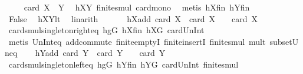 \begin{isabellebody}
\ \isamarkupfalse%
\ {\isachardoublequoteopen}{\isachardot}{\kern0pt}{\isachardot}{\kern0pt}{\isachardot}{\kern0pt}\ {\isasymle}\ card\ {\isacharparenleft}{\kern0pt}X\ {\isasymcdots}\ Y{\isacharparenright}{\kern0pt}{\isachardoublequoteclose}\ \isamarkupfalse%
\ hXY{}\ finite{\isacharunderscore}{\kern0pt}smul\ card{\isacharunderscore}{\kern0pt}mono\ \isamarkupfalse%
\ {\isacharparenleft}{\kern0pt}metis\ hXfin\ hYfin{\isacharparenright}{\kern0pt}\isanewline
\ \ \ \ \isamarkupfalse%
\ \isamarkupfalse%
\ False\ \isamarkupfalse%
\ hXYlt\ \isamarkupfalse%
\ linarith\isanewline
\ \ \isamarkupfalse%
\isanewline
\ \ \isamarkupfalse%
\ hXadd{\isacharcolon}{\kern0pt}\ {\isachardoublequoteopen}card\ {\isacharquery}{\kern0pt}X{}\ {\isacharplus}{\kern0pt}\ card\ {\isacharquery}{\kern0pt}X{}\ {\isacharequal}{\kern0pt}\ {}\ {\isacharasterisk}{\kern0pt}\ card\ X{\isachardoublequoteclose}\ \isanewline
\ \ \ \ \isamarkupfalse%
\ card{\isacharunderscore}{\kern0pt}smul{\isacharunderscore}{\kern0pt}singleton{\isacharunderscore}{\kern0pt}right{\isacharunderscore}{\kern0pt}eq\ hgG\ hXfin\ hXG\ card{\isacharunderscore}{\kern0pt}Un{\isacharunderscore}{\kern0pt}Int\isanewline
\ \ \ \ \isamarkupfalse%
\ {\isacharparenleft}{\kern0pt}metis\ Un{\isacharunderscore}{\kern0pt}Int{\isacharunderscore}{\kern0pt}eq{\isacharparenleft}{\kern0pt}{}{\isacharparenright}{\kern0pt}\ add{\isachardot}{\kern0pt}commute\ finite{\isachardot}{\kern0pt}emptyI\ finite{\isachardot}{\kern0pt}insertI\ finite{\isacharunderscore}{\kern0pt}smul\ mult{\isacharunderscore}{\kern0pt}{}\ subset{\isacharunderscore}{\kern0pt}Un{\isacharunderscore}{\kern0pt}eq{\isacharparenright}{\kern0pt}\isanewline
\ \ \isamarkupfalse%
\ hYadd{\isacharcolon}{\kern0pt}\ {\isachardoublequoteopen}card\ {\isacharquery}{\kern0pt}Y{}\ {\isacharplus}{\kern0pt}\ card\ {\isacharquery}{\kern0pt}Y{}\ {\isacharequal}{\kern0pt}\ {}\ {\isacharasterisk}{\kern0pt}\ card\ Y{\isachardoublequoteclose}\isanewline
\ \ \ \ \isamarkupfalse%
\ card{\isacharunderscore}{\kern0pt}smul{\isacharunderscore}{\kern0pt}singleton{\isacharunderscore}{\kern0pt}left{\isacharunderscore}{\kern0pt}eq\ hgG\ hYfin\ hYG\ card{\isacharunderscore}{\kern0pt}Un{\isacharunderscore}{\kern0pt}Int\ finite{\isacharunderscore}{\kern0pt}smul\isanewline
\ \ \ \ \isamarkupfalse%

\end{isabellebody}
